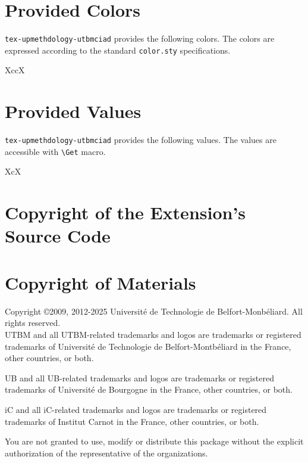 \documentclass[article]{upmethodology-document}
\gdef\upmextensiondoccolorlist{}
\gdef\upmextensiondocvaluelist{}
\begin{document}
\section{Provided Colors}

\texttt{tex-upmethdology-utbmciad} provides the following colors. The colors are expressed according to the standard \texttt{color.sty} specifications.

\begin{mtabular}{4}{XccX}
\upmextensiondoccolorlist
\end{mtabular}

\section{Provided Values}

\texttt{tex-upmethdology-utbmciad} provides the following values. The values are accessible with \texttt{{\textbackslash}Get} macro.

\begin{tiny}
\begin{mtabular}{3}{XcX}
\upmextensiondocvaluelist
\end{mtabular}
\end{tiny}

\section{Copyright of the Extension's Source Code}



\section{Copyright of Materials}

Copyright \copyright 2009, 2012-2025 Universit\'e de Technologie de Belfort-Monb\'eliard. All rights reserved. \\

UTBM and all UTBM-related trademarks and logos are trademarks or registered trademarks of Universit\'e de Technologie de Belfort-Montb\'eliard in the France, other countries, or both.

UB and all UB-related trademarks and logos are trademarks or registered trademarks of Universit\'e de Bourgogne in the France, other countries, or both.

iC and all iC-related trademarks and logos are trademarks or registered trademarks of Institut Carnot in the France, other countries, or both.

You are not granted to use, modify or distribute this package without the explicit authorization of the representative of the organizations.
\end{document}
